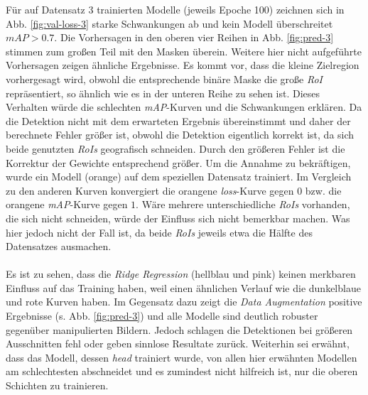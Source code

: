 Für auf Datensatz 3 trainierten Modelle (jeweils Epoche 100) zeichnen sich in  Abb. \ref{fig:val-loss-3} starke Schwankungen ab und kein Modell überschreitet $mAP>0.7$. Die Vorhersagen in den oberen vier Reihen in Abb. \ref{fig:pred-3} stimmen zum großen Teil mit den Masken überein. Weitere hier nicht aufgeführte Vorhersagen zeigen ähnliche Ergebnisse. Es kommt vor, dass die kleine Zielregion vorhergesagt wird, obwohl die entsprechende binäre Maske die große \textit{RoI} repräsentiert, so ähnlich wie es in der unteren Reihe zu sehen ist. Dieses Verhalten würde die schlechten \textit{mAP}-Kurven und die Schwankungen erklären. Da die Detektion nicht mit dem erwarteten Ergebnis übereinstimmt und daher der berechnete Fehler größer ist, obwohl die Detektion eigentlich korrekt ist, da sich beide genutzten \textit{RoIs} geografisch schneiden. Durch den größeren Fehler ist die Korrektur der Gewichte entsprechend größer. Um die Annahme zu bekräftigen, wurde ein Modell (orange) auf dem speziellen Datensatz trainiert. Im Vergleich zu den anderen Kurven konvergiert die orangene \textit{loss}-Kurve gegen $0$ bzw. die orangene \textit{mAP}-Kurve gegen $1$. Wäre mehrere unterschiedliche \textit{RoIs} vorhanden, die sich nicht schneiden, würde der Einfluss sich nicht bemerkbar machen. Was hier jedoch nicht der Fall ist, da beide \textit{RoIs} jeweils etwa die Hälfte des Datensatzes ausmachen.
\\\\
Es ist zu sehen, dass die \textit{Ridge Regression} (hellblau und pink) keinen merkbaren Einfluss auf das Training haben, weil einen ähnlichen Verlauf wie die dunkelblaue und rote Kurven haben. Im Gegensatz dazu zeigt die \textit{Data Augmentation} positive Ergebnisse (s. Abb. \ref{fig:pred-3}) und alle Modelle sind deutlich robuster gegenüber manipulierten Bildern. Jedoch schlagen die Detektionen bei größeren Ausschnitten fehl oder geben sinnlose Resultate zurück. Weiterhin sei erwähnt, dass das Modell, dessen \textit{head} trainiert wurde, von allen hier erwähnten Modellen am schlechtesten abschneidet und es zumindest nicht hilfreich ist, nur die oberen Schichten zu trainieren.